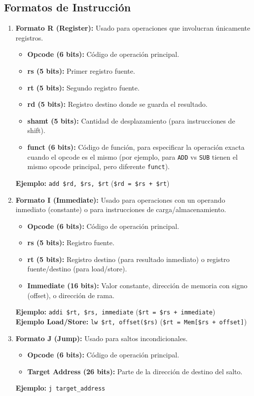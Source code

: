 \documentclass[letterpaper]{article}
\begin{document}
	\subsection{Formatos de Instrucción}
	\begin{enumerate}
		\item \textbf{Formato R (Register):} Usado para operaciones que involucran únicamente registros.
		\begin{itemize}
			\item \textbf{Opcode (6 bits):} Código de operación principal.
			\item \textbf{rs (5 bits):} Primer registro fuente.
			\item \textbf{rt (5 bits):} Segundo registro fuente.
			\item \textbf{rd (5 bits):} Registro destino donde se guarda el resultado.
			\item \textbf{shamt (5 bits):} Cantidad de desplazamiento (para instrucciones de shift).
			\item \textbf{funct (6 bits):} Código de función, para especificar la operación exacta cuando el opcode es el mismo (por ejemplo, para \texttt{ADD} vs \texttt{SUB} tienen el mismo opcode principal, pero diferente \texttt{funct}).
		\end{itemize}
		\textbf{Ejemplo:} \texttt{add \$rd, \$rs, \$rt} (\texttt{\$rd = \$rs + \$rt})
		
		\item \textbf{Formato I (Immediate):} Usado para operaciones con un operando inmediato (constante) o para instrucciones de carga/almacenamiento.
		\begin{itemize}
			\item \textbf{Opcode (6 bits):} Código de operación principal.
			\item \textbf{rs (5 bits):} Registro fuente.
			\item \textbf{rt (5 bits):} Registro destino (para resultado inmediato) o registro fuente/destino (para load/store).
			\item \textbf{Immediate (16 bits):} Valor constante, dirección de memoria con signo (offset), o dirección de rama.
		\end{itemize}
		\textbf{Ejemplo:} \texttt{addi \$rt, \$rs, immediate} (\texttt{\$rt = \$rs + immediate})\\
		\textbf{Ejemplo Load/Store:} \texttt{lw \$rt, offset(\$rs)} (\texttt{\$rt = Mem[\$rs + offset]})
		
		\item \textbf{Formato J (Jump):} Usado para saltos incondicionales.
		\begin{itemize}
			\item \textbf{Opcode (6 bits):} Código de operación principal.
			\item \textbf{Target Address (26 bits):} Parte de la dirección de destino del salto.
		\end{itemize}
		\textbf{Ejemplo:} \texttt{j target\_address}
	\end{enumerate}
	
\end{document}
